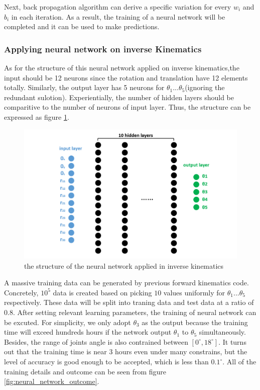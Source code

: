 Next, back propagation algorithm can derive a specific variation for every $w_i$ and $b_i$ in each iteration. As a result, the training of a neural network will be completed and it can be used to make predictions.  

\subsubsection{Applying neural network on inverse Kinematics}
As for the structure of this neural network applied on inverse kinematics,the input should be 12 neurons since the rotation and translation have 12 elements totally. Similarly, the output layer has 5 neurons for $\theta_1...\theta_5$(ignoring the redundant sulotion). Experientially, the number of hidden layers should be comparitive to the number of neurons of input layer. Thus, the structure can be expressed as figure \ref{fig:IK_neural_network}. 

\begin{figure}[htbp] 
\begin{center}
\includegraphics[width=\textwidth]{images/IK_neural_network}
\caption{the structure of the neural network applied in inverse kinematics}
\label{fig:IK_neural_network}
\end{center}
\end{figure}

A massive training data can be generated by previous forward kinematics code. Concretely, $10^5$ data is created based on picking $10$ values uniformly for $\theta_1...\theta_5$ respectively. These data will be split into traning data and test data at a ratio of $0.8$.
After setting relevant learning parameters, the training of neural network can be excuted. For simplicity, we only adopt $\theta_3$ as the output because the training time will exceed hundreds hours if the network output $\theta_1$ to $\theta_5$ simultaneously. Besides, the range of joints angle is also contrained between $[0^{\circ},18^{\circ}]$. 
It turns out that the training time is near 3 hours even under many constrains, but the level of accuracy is good enough to be accepted, which is less than $0.1^{\circ}$. All of the training details and outcome can be seen from figure \ref{fig:neural_network_outcome}.

